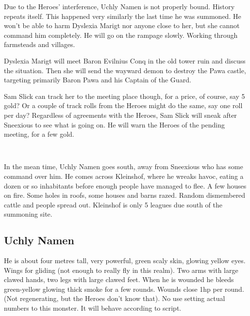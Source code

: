 Due to the Heroes' interference, Uchly Namen is not properly bound. History repeats itself. This happened very similarly the last time he was summoned.
He won't be able to harm Dyslexia Marigt nor anyone close to her, but she cannot command him completely.
He will go on the rampage slowly. Working through farmsteads and villages.

Dyslexia Marigt will meet Baron Evilnius Conq in the old tower ruin and discuss the situation. Then she will send the wayward demon to destroy the Pawa castle, targeting primarily Baron Pawa and his Captain of the Guard.

Sam Slick can track her to the meeting place though, for a price, of course, say 5 gold? Or a couple of track rolls from the Heroes might do the same, say one roll per day?
Regardless of agreements with the Heroes, Sam Slick will sneak after Sneexious to see what is going on. He will warn the Heroes of the pending meeting, for a few gold.

\

In the mean time, Uchly Namen goes south, away from Sneexious who has some command over him. He comes across Kleinshof, where he wreaks havoc, eating a dozen or so inhabitants before enough people have managed to flee.
A few houses on fire. Some holes in roofs, some houses and barns razed. Random dismembered cattle and people spread out. Kleinshof is only 5 leagues due south of the summoning site.


\subsection*{Uchly Namen}
He is about four metres tall, very powerful, green scaly skin, glowing yellow eyes. Wings for gliding (not enough to really fly in this realm). Two arms with large clawed hands, two legs with large clawed feet.
When he is wounded he bleeds green-yellow glowing thick smoke for a few rounds. Wounds close 1hp per round. (Not regenerating, but the Heroes don't know that).
No use setting actual numbers to this monster. It will behave according to script.

\raggedbottom

